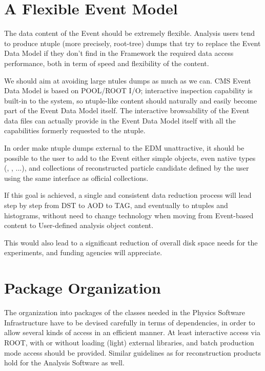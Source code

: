 \documentclass[draftmode]{memarticle}
\begin{document}
\section{A Flexible Event Model}
\label{sec:ntuples}
The data content of the Event should be extremely flexible.
Analysis users tend to produce ntuple (more precisely, root-tree) dumps
that try to replace the Event Data Model if they don't find
in the Framework the required data access performance, both in term
of speed and flexibility of the content.

We should aim at avoiding large ntules dumps as much as we can. CMS Event Data
Model is based on POOL/ROOT I/O; interactive inspection capability is built-in 
to the system, so ntuple-like content should naturally and easily become
part of the Event Data Model itself. The interactive browsability of the
Event data files can actually provide in the Event Data Model itself with  all
the capabilities formerly requested to the ntuple. 

In order make ntuple dumps external to the EDM unattractive, 
it should be possible to the user
to add to the Event either simple objects, even native types 
(, , ...), and collections 
of reconstructed particle candidate defined by the user 
using the same interface as official collections.

If this goal is achieved, a single and consistent data reduction
process will lead step by step from DST to AOD to TAG, and eventually to
ntuples and histograms, without need to change technology when 
moving from Event-based content to User-defined analysis object content.

This would also lead to a significant reduction of overall disk
space needs for the experiments, and funding agencies will
appreciate. 

\section{Package Organization}

The organization into packages of the classes needed
in the Physics Software Infrastructure have to be 
devised carefully in terms of dependencies, in order
to allow several kinds of access in an efficient manner.
At least interactive access via ROOT, 
with or without loading (light) external libraries,
and batch production mode access should be provided. 
Similar guidelines as for reconstruction products hold
for the Analysis Software as well.
\end{document}

